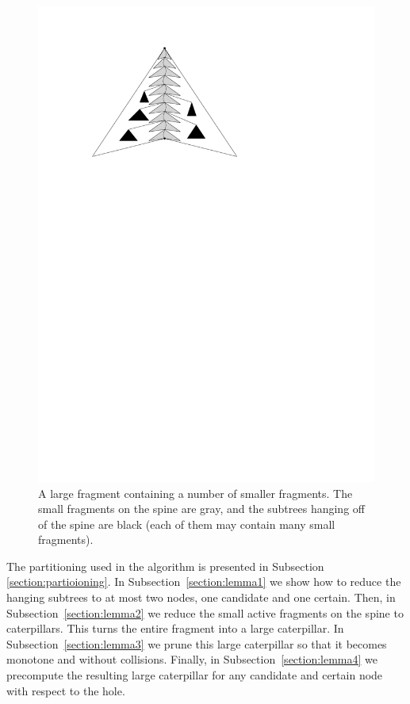 \documentclass[11pt,a4paper]{article}
\theoremstyle{definition}
\theoremstyle{remark}
\begin{document}
\begin{figure}[h]
\begin{center}
\includegraphics[scale=1]{refinement}
\end{center}
\caption{A large fragment containing a number of smaller fragments. The small fragments on the spine are gray, and the subtrees hanging off of the spine are black (each of them may contain many small fragments). 
\label{figure of small fragments inside a large fragment}}
\end{figure}

The partitioning used in the algorithm is presented in Subsection \ref{section:partioioning}. In Subsection~\ref{section:lemma1} we show how to reduce the hanging subtrees to at most two nodes, one candidate and one certain. Then, in Subsection~\ref{section:lemma2} we reduce the small active fragments on the spine to caterpillars. This turns the entire fragment into a large caterpillar. In Subsection~\ref{section:lemma3} we prune this large caterpillar so that it becomes monotone and without collisions. Finally, in Subsection~\ref{section:lemma4} we precompute
the resulting large caterpillar for any candidate and certain node with respect to the hole.
\end{document}
